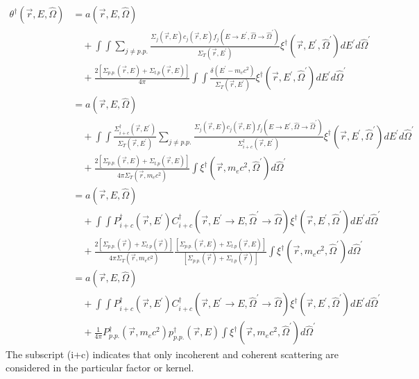 \begin{align}
  \theta^{\dagger}(\vec{r},E,\hat{\Omega}) & = a(\vec{r},E,\hat{\Omega}) 
  \nonumber \\
  & \quad + \int\int \sum_{j \neq p.p.} \frac{\Sigma_j(\vec{r},E)c_j(\vec{r},E)
    f_j(E \to E^{'},\hat{\Omega} \to \hat{\Omega}^{'})}{\Sigma_T(\vec{r},E^{'})}
  \xi^{\dagger}(\vec{r},E^{'},\hat{\Omega}^{'}) dE^{'} d\hat{\Omega}^{'}
  \nonumber \\ 
  & \quad + \frac{2\left[\Sigma_{p.p.}(\vec{r},E)+\Sigma_{t.p}(\vec{r},E)\right]}
  {4\pi} \int\int \frac{\delta(E^{'}-m_ec^2)}{\Sigma_T(\vec{r},E^{'})}
  \xi^{\dagger}(\vec{r},E^{'},\hat{\Omega}^{'}) dE^{'} d\hat{\Omega}^{'}
  \nonumber \\
  & = a(\vec{r},E,\hat{\Omega}) \nonumber \\
  & \quad + \int\int \frac{\Sigma_{i+c}^{\dagger}(\vec{r},E^{'})}
            {\Sigma_T(\vec{r},E^{'})} 
            \sum_{j \neq p.p.} \frac{\Sigma_j(\vec{r},E)c_j(\vec{r},E)
              f_j(E \to E^{'},\hat{\Omega} \to \hat{\Omega}^{'})}
                {\Sigma_{i+c}^{\dagger}(\vec{r},E^{'})}
            \xi^{\dagger}(\vec{r},E^{'},\hat{\Omega}^{'}) dE^{'} d\hat{\Omega}^{'}
            \nonumber \\ 
  & \quad + \frac{2\left[\Sigma_{p.p.}(\vec{r},E)+\Sigma_{t.p}(\vec{r},E)\right]}
                 {4\pi \Sigma_T(\vec{r},m_ec^2)}
  \int \xi^{\dagger}(\vec{r},m_ec^2,\hat{\Omega}^{'}) d\hat{\Omega}^{'}
  \nonumber \\
  & = a(\vec{r},E,\hat{\Omega}) \nonumber \\
  & \quad + \int\int P_{i+c}^{\dagger}(\vec{r},E^{'})
  C_{i+c}^{\dagger}(\vec{r},E^{'} \to E, \hat{\Omega}^{'} \to \hat{\Omega})
  \xi^{\dagger}(\vec{r},E^{'},\hat{\Omega}^{'}) dE^{'} d\hat{\Omega}^{'}
  \nonumber \\
  & \quad + \frac{2\left[\Sigma_{p.p.}(\vec{r})+\Sigma_{t.p}(\vec{r})\right]}
            {4\pi\Sigma_T(\vec{r},m_ec^2)}
  \frac{\left[\Sigma_{p.p.}(\vec{r},E)+\Sigma_{t.p}(\vec{r},E)\right]}
  {\left[\Sigma_{p.p.}(\vec{r})+\Sigma_{t.p}(\vec{r})\right]} 
  \int \xi^{\dagger}(\vec{r},m_ec^2,\hat{\Omega}^{'}) d\hat{\Omega}^{'}
  \nonumber \\
  & = a(\vec{r},E,\hat{\Omega}) \nonumber \\
  & \quad + \int\int P_{i+c}^{\dagger}(\vec{r},E^{'})
  C_{i+c}^{\dagger}(\vec{r},E^{'} \to E, \hat{\Omega}^{'} \to \hat{\Omega})
  \xi^{\dagger}(\vec{r},E^{'},\hat{\Omega}^{'}) dE^{'} d\hat{\Omega}^{'}
  \nonumber \\
  & \quad + \frac{1}{4\pi}P_{p.p.}^{\dagger}(\vec{r},m_ec^2)
  p_{p.p.}^{\dagger}(\vec{r},E)
  \int \xi^{\dagger}(\vec{r},m_ec^2,\hat{\Omega}^{'}) d\hat{\Omega}^{'}
  \nonumber 
\end{align}
The subscript (i+c) indicates that only incoherent and coherent scattering are
considered in the particular factor or kernel. 

